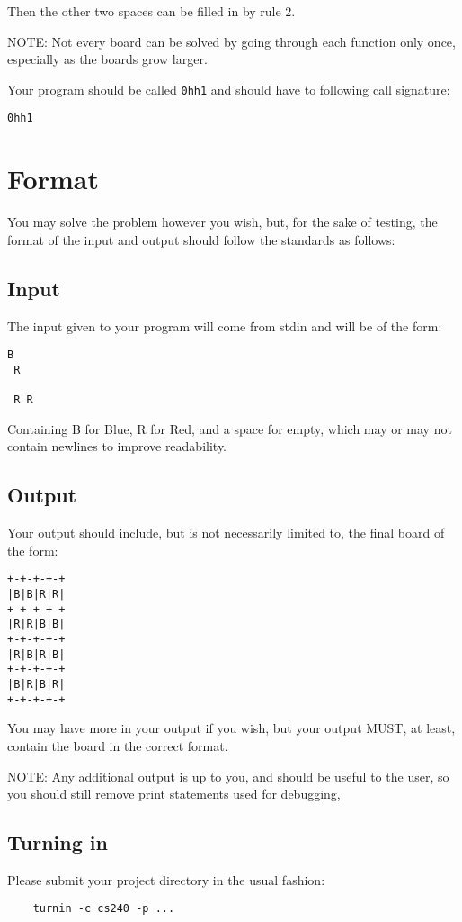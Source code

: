 \documentclass{article}
\begin{document}
Then the other two spaces can be filled in by rule 2.


NOTE: Not every board can be solved by going through each function only once, especially as the boards grow larger.

Your program should be called \texttt{0hh1} and should have to
following call signature:

\begin{verbatim} 
0hh1
\end{verbatim} 

\section{Format}
You may solve the problem however you wish, but, for the sake of testing, 
the format of the input and output should follow the standards as follows:

\subsection{Input}
The input given to your program will come from stdin and will be of the form:
\begin{verbatim}
B   
 R  
    
 R R
\end{verbatim}

Containing B for Blue, R for Red, and a space for empty, which may or may not contain newlines
to improve readability.

\subsection{Output}
Your output should include, but is not necessarily limited to, the final board of the form:
\begin{verbatim}
+-+-+-+-+
|B|B|R|R|
+-+-+-+-+
|R|R|B|B|
+-+-+-+-+
|R|B|R|B|
+-+-+-+-+
|B|R|B|R|
+-+-+-+-+
\end{verbatim}

You may have more in your output if you wish, but your output MUST, at least,
contain the board in the correct format. 

NOTE: Any additional output is up to you, and should be useful to the user, so you should still 
remove print statements used for debugging,

\subsection*{Turning in}

Please submit your project directory in the usual fashion:
\begin{lstlisting}
	turnin -c cs240 -p ...
\end{lstlisting}
\end{document}

